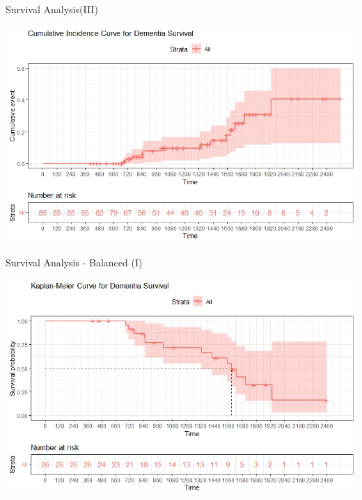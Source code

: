 \documentclass{beamer}
\begin{document}
	\begin{frame}{Survival Analysis(III)}
	
		\begin{center}
			\includegraphics[width=0.95\columnwidth]{cumulative.jpeg}
		\end{center}
	\end{frame}


	\begin{frame}{Survival Analysis - Balanced (I)}
	
		\begin{center}
			\includegraphics[width=\columnwidth]{kaplan-meier_bilanciati.jpeg}
		\end{center}
	\end{frame}
	
\end{document}
